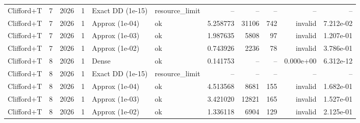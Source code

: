 \begin{tabular}{lrrrllrrrrr}
Clifford+T & 7 & 2026 & 1 & Exact DD (1e-15) & resource\_limit & -- & -- & -- & -- & -- \\
Clifford+T & 7 & 2026 & 1 & Approx (1e-04) & ok & 5.258773 & 31106 & 742 & invalid & 7.212e-02 \\
Clifford+T & 7 & 2026 & 1 & Approx (1e-03) & ok & 1.987635 & 5808 & 97 & invalid & 1.207e-01 \\
Clifford+T & 7 & 2026 & 1 & Approx (1e-02) & ok & 0.743926 & 2236 & 78 & invalid & 3.786e-01 \\
Clifford+T & 8 & 2026 & 1 & Dense & ok & 0.141753 & -- & -- & 0.000e+00 & 6.312e-12 \\
Clifford+T & 8 & 2026 & 1 & Exact DD (1e-15) & resource\_limit & -- & -- & -- & -- & -- \\
Clifford+T & 8 & 2026 & 1 & Approx (1e-04) & ok & 4.513568 & 8681 & 155 & invalid & 1.682e-01 \\
Clifford+T & 8 & 2026 & 1 & Approx (1e-03) & ok & 3.421020 & 12821 & 165 & invalid & 1.527e-01 \\
Clifford+T & 8 & 2026 & 1 & Approx (1e-02) & ok & 1.336118 & 6904 & 129 & invalid & 2.125e-01 \\
\hline
\end{tabular}
